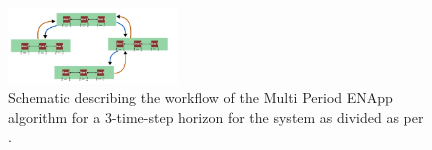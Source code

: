 \documentclass[conference]{IEEEtran} %
\begin{document}
\begin{figure}[h]
    \centering
    \includegraphics[width=0.4\textwidth]{figures/mpopf-spatially-distributed-temporally-brute-forced.jpg}
    \caption{Schematic describing the workflow of the Multi Period ENApp algorithm for a 3-time-step horizon for the system as divided as per .}
    \label{fig:mpenapp}
\end{figure}



\end{document}
